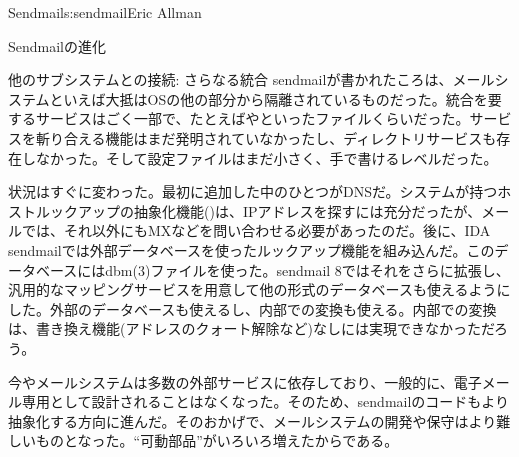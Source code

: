 \begin{aosachapter}{Sendmail}{s:sendmail}{Eric Allman}
\begin{aosasect1}{Sendmailの進化}
\begin{aosasect2}{他のサブシステムとの接続: さらなる統合}
sendmailが書かれたころは、メールシステムといえば大抵はOSの他の部分から隔離されているものだった。統合を要するサービスはごく一部で、たとえばやといったファイルくらいだった。サービスを斬り合える機能はまだ発明されていなかったし、ディレクトリサービスも存在しなかった。そして設定ファイルはまだ小さく、手で書けるレベルだった。

状況はすぐに変わった。最初に追加した中のひとつがDNSだ。システムが持つホストルックアップの抽象化機能()は、IPアドレスを探すには充分だったが、メールでは、それ以外にもMXなどを問い合わせる必要があったのだ。後に、IDA sendmailでは外部データベースを使ったルックアップ機能を組み込んだ。このデータベースにはdbm(3)ファイルを使った。sendmail 8ではそれをさらに拡張し、汎用的なマッピングサービスを用意して他の形式のデータベースも使えるようにした。外部のデータベースも使えるし、内部での変換も使える。内部での変換は、書き換え機能(アドレスのクォート解除など)なしには実現できなかっただろう。

今やメールシステムは多数の外部サービスに依存しており、一般的に、電子メール専用として設計されることはなくなった。そのため、sendmailのコードもより抽象化する方向に進んだ。そのおかげで、メールシステムの開発や保守はより難しいものとなった。``可動部品''がいろいろ増えたからである。

\end{aosasect2}


\end{aosasect1}
\end{aosachapter}
